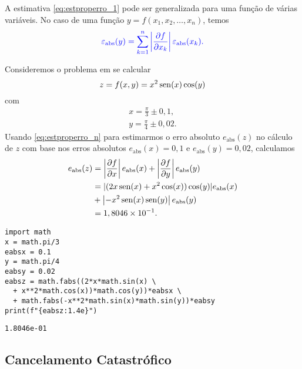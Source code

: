 A estimativa \eqref{eq:estproperro_1} pode ser generalizada para uma função de várias variáveis. No caso de uma função $y = f(x_1,x_2,\dotsc,x_n)$, temos
\begin{equation}\label{eq:estproperro_n}
  \color{blue}\varepsilon_{\text{abs}}(y) = \sum_{k=1}^n \left|\frac{\partial f}{\partial x_k}\right|\varepsilon_{\text{abs}}(x_k).
\end{equation}

\begin{ex}\label{ex:properro_2}
  Consideremos o problema em se calcular
  \begin{equation}
    z = f(x,y) = x^2\operatorname{sen}(x)\cos(y)
  \end{equation}
  com
  \begin{gather}
    x = \frac{\pi}{3} \pm 0,1,\\
    y = \frac{\pi}{4} \pm 0,02.
  \end{gather}
  Usando \eqref{eq:estproperro_n} para estimarmos o erro absoluto $e_{\text{abs}}(z)$ no cálculo de $z$ com base nos erros absolutos $e_{\text{abs}}(x)=0,1$ e $e_{\text{abs}}(y)=0,02$, calculamos
  \begin{align}
    e_{\text{abs}}(z) &= \left|\frac{\partial f}{\partial x}\right|e_{\text{abs}}(x) + \left|\frac{\partial f}{\partial y}\right|e_{\text{abs}}(y)\\
                      &= |(2x\operatorname{sen}(x) + x^2\cos(x))\cos(y)|e_{\text{abs}}(x)\\
                      &+ \left|-x^2\operatorname{sen}(x)\operatorname{sen}(y)\right|e_{\text{abs}}(y)\\
                      &= 1,8046\times 10^{-1}.
  \end{align}
  
  
\begin{lstlisting}
import math
x = math.pi/3
eabsx = 0.1
y = math.pi/4
eabsy = 0.02
eabsz = math.fabs((2*x*math.sin(x) \
  + x**2*math.cos(x))*math.cos(y))*eabsx \
  + math.fabs(-x**2*math.sin(x)*math.sin(y))*eabsy
print(f"{eabsz:1.4e}")
\end{lstlisting}

\begin{verbatim}
1.8046e-01    
\end{verbatim}

\end{ex}


\subsection{Cancelamento Catastrófico}

